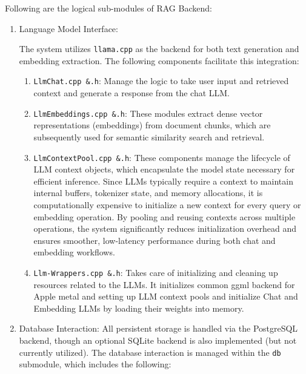 Following are the logical sub-modules of RAG Backend:
\begin{enumerate}[label=\Alph*.]
\item{Language Model Interface:}

The system utilizes \texttt{llama.cpp} as the backend for both text generation and embedding extraction. The following components facilitate this integration:

\begin{enumerate}
    \item \texttt{LlmChat.cpp \&.h}: Manage the logic to take user input and retrieved context and generate a response from the chat LLM. 
    \item \texttt{LlmEmbeddings.cpp \&.h}: These modules extract dense vector representations (embeddings) from document chunks, which are subsequently used for semantic similarity search and retrieval.
    \item \texttt{LlmContextPool.cpp \&.h}: These components manage the lifecycle of LLM context objects, which encapsulate the model state necessary for efficient inference. Since LLMs typically require a context to maintain internal buffers, tokenizer state, and memory allocations, it is computationally expensive to initialize a new context for every query or embedding operation. By pooling and reusing contexts across multiple operations, the system significantly reduces initialization overhead and ensures smoother, low-latency performance during both chat and embedding workflows.
    \item \texttt{Llm-Wrappers.cpp \&.h}: Takes care of initializing and cleaning up resources related to the LLMs. It initializes common ggml backend for Apple metal and setting up LLM context pools and initialize Chat and Embedding LLMs by loading their weights into memory.
\end{enumerate}

\item{Database Interaction:}
All persistent storage is handled via the PostgreSQL backend, though an optional SQLite backend is also implemented (but not currently utilized). The database interaction is managed within the \texttt{db} submodule, which includes the following:


\end{enumerate}
